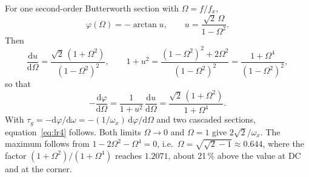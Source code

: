 \documentclass[11pt,a4paper]{article}
\begin{document}
For one second-order Butterworth section with $\Omega = f/f_x$,
%
\begin{equation}
  \varphi(\Omega) = -\arctan u, \qquad u = \frac{\sqrt{2}\,\Omega}{1-\Omega^2}.
\end{equation}
%
Then
%
\begin{equation}
  \frac{\mathrm{d}u}{\mathrm{d}\Omega}
  = \frac{\sqrt{2}\,(1+\Omega^2)}{(1-\Omega^2)^2},
  \qquad
  1 + u^2 = \frac{(1-\Omega^2)^2 + 2\Omega^2}{(1-\Omega^2)^2}
          = \frac{1+\Omega^4}{(1-\Omega^2)^2},
\end{equation}
%
so that
%
\begin{equation}
  -\frac{\mathrm{d}\varphi}{\mathrm{d}\Omega}
  = \frac{1}{1+u^2}\,\frac{\mathrm{d}u}{\mathrm{d}\Omega}
  = \frac{\sqrt{2}\,(1+\Omega^2)}{1+\Omega^4}.
\end{equation}
%
With $\tau_g = -\mathrm{d}\varphi/\mathrm{d}\omega =
-(1/\omega_x)\,\mathrm{d}\varphi/\mathrm{d}\Omega$ and two cascaded sections,
equation~\eqref{eq:lr4} follows. Both limits $\Omega \to 0$ and $\Omega = 1$
give $2\sqrt{2}/\omega_x$. The maximum follows from $1 - 2\Omega^2 - \Omega^4 = 0$,
i.e.\ $\Omega = \sqrt{\sqrt{2}-1} \approx 0.644$, where the factor
$(1+\Omega^2)/(1+\Omega^4)$ reaches $1.2071$, about 21\,\% above the value at
DC and at the corner.
\end{document}
